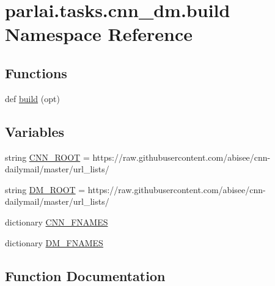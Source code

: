 \hypertarget{namespaceparlai_1_1tasks_1_1cnn__dm_1_1build}{}\section{parlai.\+tasks.\+cnn\+\_\+dm.\+build Namespace Reference}
\label{namespaceparlai_1_1tasks_1_1cnn__dm_1_1build}
\subsection*{Functions}
\begin{DoxyCompactItemize}
\item 
def \hyperlink{namespaceparlai_1_1tasks_1_1cnn__dm_1_1build_ad2c68b11a275c9630ade4d09495b7ece}{build} (opt)
\end{DoxyCompactItemize}
\subsection*{Variables}
\begin{DoxyCompactItemize}
\item 
string \hyperlink{namespaceparlai_1_1tasks_1_1cnn__dm_1_1build_af43cab2a5e95e7d1e8373c69aa35086e}{C\+N\+N\+\_\+\+R\+O\+OT} = \textquotesingle{}https\+://raw.\+githubusercontent.\+com/abisee/cnn-\/dailymail/master/url\+\_\+lists/\textquotesingle{}
\item 
string \hyperlink{namespaceparlai_1_1tasks_1_1cnn__dm_1_1build_a9799a43e748085759f008d043eaa7d69}{D\+M\+\_\+\+R\+O\+OT} = \textquotesingle{}https\+://raw.\+githubusercontent.\+com/abisee/cnn-\/dailymail/master/url\+\_\+lists/\textquotesingle{}
\item 
dictionary \hyperlink{namespaceparlai_1_1tasks_1_1cnn__dm_1_1build_ad1f00c164bf130900f5ccd059e6c8118}{C\+N\+N\+\_\+\+F\+N\+A\+M\+ES}
\item 
dictionary \hyperlink{namespaceparlai_1_1tasks_1_1cnn__dm_1_1build_a8d9dcf86181a23e28f504f7b30f59263}{D\+M\+\_\+\+F\+N\+A\+M\+ES}
\end{DoxyCompactItemize}


\subsection{Function Documentation}
\mbox{\label{namespaceparlai_1_1tasks_1_1cnn__dm_1_1build_ad2c68b11a275c9630ade4d09495b7ece}} 
